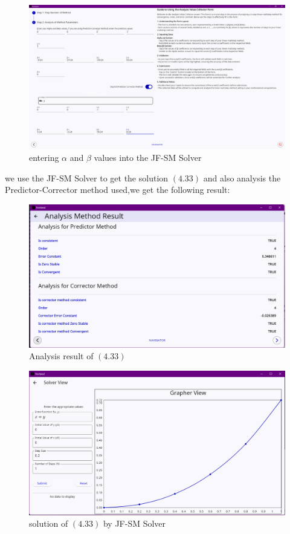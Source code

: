 \begin{figure}[htbp]
    \centering
    \includegraphics[width=1\textwidth]{chapters/4/image/solver_5.png}
    \caption{entering $\alpha$ and $\beta$ values into the JF-SM Solver }
\end{figure}


we use the JF-SM Solver to get the solution $(4.33)$ and also analysis the Predictor-Corrector method  used,we get the following result:


\begin{figure}[htbp]
    \centering
    \includegraphics[width=1\textwidth]{chapters/4/image/solver_6.png}
    \caption{Analysis result of $(4.33)$ }
\end{figure}


\begin{figure}[htbp]
    \centering
    \includegraphics[width=1\textwidth]{chapters/4/image/solver_7.png}
    \caption{solution of $(4.33)$ by JF-SM Solver}
\end{figure}


